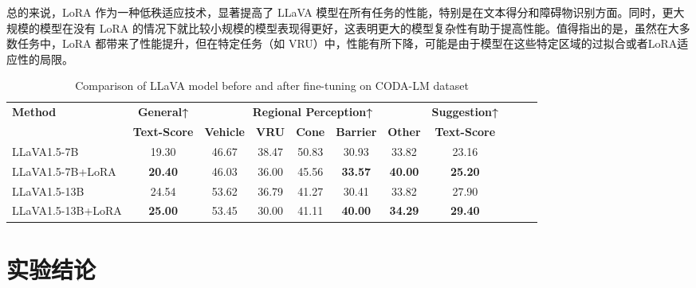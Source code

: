 \documentclass[
    linespread = 1.25
]{ctexart}
\begin{document}
总的来说，LoRA 作为一种低秩适应技术，显著提高了 LLaVA 模型在所有任务的性能，特别是在文本得分和障碍物识别方面。同时，更大规模的模型在没有 LoRA 的情况下就比较小规模的模型表现得更好，这表明更大的模型复杂性有助于提高性能。值得指出的是，虽然在大多数任务中，LoRA 都带来了性能提升，但在特定任务（如 VRU）中，性能有所下降，可能是由于模型在这些特定区域的过拟合或者LoRA适应性的局限。
\begin{table}[htbp]
  \centering
  \caption{Comparison of LLaVA model before and after fine-tuning on CODA-LM dataset}
  \label{CODA-LM result}
  \small %
  \begin{tabular}{lcccccccccc}
    \toprule
    \textbf{Method}   & \textbf{General↑}   & \multicolumn{5}{c}{\textbf{Regional Perception↑}} & \textbf{Suggestion↑}                                                                           \\
    \cmidrule(r){3-7}
                      & \textbf{Text-Score} & \textbf{Vehicle}                                  & \textbf{VRU}         & \textbf{Cone} & \textbf{Barrier} & \textbf{Other} & \textbf{Text-Score} \\
    \midrule
    LLaVA1.5-7B       & 19.30               & 46.67                                             & 38.47                & 50.83         & 30.93            & 33.82          & 23.16               \\
    LLaVA1.5-7B+LoRA  & \textbf{20.40}      & 46.03                                             & 36.00                & 45.56         & \textbf{33.57}   & \textbf{40.00} & \textbf{25.20}      \\
    \midrule
    LLaVA1.5-13B      & 24.54               & 53.62                                             & 36.79                & 41.27         & 30.41            & 33.82          & 27.90               \\
    LLaVA1.5-13B+LoRA & \textbf{25.00}      & 53.45                                             & 30.00                & 41.11         & \textbf{40.00}   & \textbf{34.29} & \textbf{29.40}      \\
    \bottomrule
  \end{tabular}
\end{table}



\section{实验结论}
\end{document}
